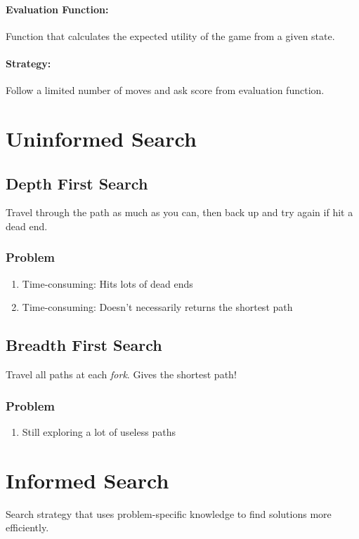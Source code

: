 \paragraph{Evaluation Function:} Function that calculates the expected utility of
the game from a given state.

\paragraph{Strategy:} Follow a limited number of moves and ask score from evaluation
function.

\section{Uninformed Search}
\subsection{Depth First Search}
Travel through the path as much as you can, then back up and try again if hit a
dead end.

\subsubsection{Problem}
\begin{enumerate}
	\item Time-consuming: Hits lots of dead ends
	\item Time-consuming: Doesn't necessarily returns the shortest path
\end{enumerate}

\subsection{Breadth First Search}
Travel all paths at each \emph{fork}. Gives the shortest path!

\subsubsection{Problem}
\begin{enumerate}
	\item Still exploring a lot of useless paths
\end{enumerate}

\section{Informed Search}
Search strategy that uses problem-specific knowledge to find solutions more efficiently.

